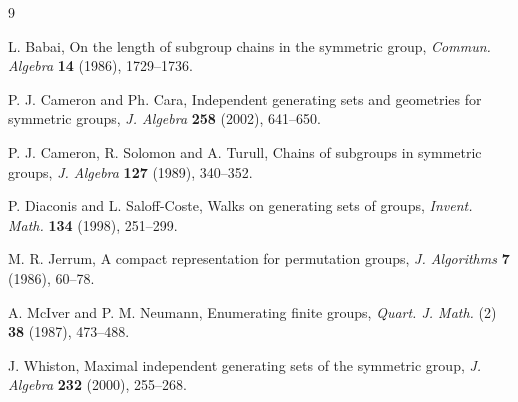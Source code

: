 \documentclass[12pt]{article}
\begin{document}
\begin{thebibliography}{9}

L. Babai,
On the length of subgroup chains in the symmetric group,
\textit{Commun. Algebra} \textbf{14} (1986), 1729--1736.

P. J. Cameron and Ph. Cara,
Independent generating sets and geometries for symmetric groups,
\textit{J. Algebra} \textbf{258} (2002), 641--650.

P. J. Cameron, R. Solomon and A. Turull, 
Chains of subgroups in symmetric groups,
\textit{J. Algebra} \textbf{127} (1989), 340--352.

P. Diaconis and L. Saloff-Coste,
Walks on generating sets of groups,
\textit{Invent. Math.} \textbf{134} (1998), 251--299.

M. R. Jerrum,
A compact representation for permutation groups,
\textit{J. Algorithms} \textbf{7} (1986), 60--78.

A. McIver and P. M. Neumann,
Enumerating finite groups,
\textit{Quart. J. Math.} (2) \textbf{38} (1987), 473--488.

J. Whiston,
Maximal independent generating sets of the symmetric group,
\textit{J. Algebra} \textbf{232} (2000), 255--268.

\end{thebibliography}
\end{document}
